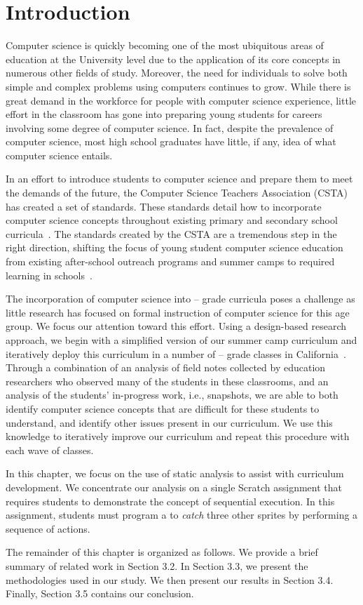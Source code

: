 \section{Introduction}
Computer science is quickly becoming one of the most ubiquitous areas of
education at the University level due to the application of its core concepts
in numerous other fields of study.  Moreover, the need for individuals to solve
both simple and complex problems using computers continues to grow. While there
is great demand in the workforce for people with computer science experience,
little effort in the classroom has gone into preparing young students for
careers involving some degree of computer science. In fact, despite the
prevalence of computer science, most high school graduates have little, if any,
idea of what computer science entails.

In an effort to introduce students to computer science and prepare them to meet
the demands of the future, the Computer Science Teachers Association (CSTA) has
created a set of standards.  These standards detail how to incorporate computer
science concepts throughout existing primary and secondary school
curricula~\cite{cstastandards}. The standards created by the CSTA are a
tremendous step in the right direction, shifting the focus of young student
computer science education from existing after-school outreach programs and
summer camps to required learning in schools~\cite{wayanoutpost,
  georgiaoutreach, Franklin:2011:ATA:1953163.1953295,
  Maloney:2010:SPL:1868358.1868363, Dann:2000:MCP:343048.343070,
  Hood:2005:TPL:1067445.1067454, csunplugged}.

The incorporation of computer science into -- grade curricula
poses a challenge as little research has focused on formal instruction of
computer science for this age group. We focus our attention toward this
effort. Using a design-based research approach, we begin with a simplified
version of our summer camp curriculum and iteratively deploy this curriculum in
a number of -- grade classes in
California~\cite{Franklin:2013:SBO}. Through a combination of an analysis of
field notes collected by education researchers who observed many of the
students in these classrooms, and an analysis of the students’ in-progress
work, i.e., snapshots, we are able to both identify computer science concepts
that are difficult for these students to understand, and identify other issues
present in our curriculum. We use this knowledge to iteratively improve our
curriculum and repeat this procedure with each wave of classes.

In this chapter, we focus on the use of static analysis to assist with
curriculum development. We concentrate our analysis on a single Scratch
assignment that requires students to demonstrate the concept of sequential
execution. In this assignment, students must program a \net{} to \emph{catch}
three other sprites by performing a sequence of actions.

The remainder of this chapter is organized as follows. We provide a brief
summary of related work in Section 3.2. In Section 3.3, we present the
methodologies used in our study. We then present our results in Section
3.4. Finally, Section 3.5 contains our conclusion.
